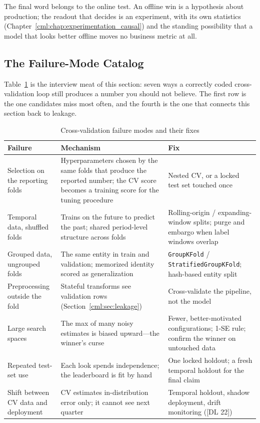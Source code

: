 The final word belongs to the online test. An offline win is a hypothesis about production; the readout that decides is an experiment, with its own statistics (Chapter~\ref{cml:chap:experimentation_causal}) and the standing possibility that a model that looks better offline moves no business metric at all.

\subsection{The Failure-Mode Catalog}

Table~\ref{cml:tab:cv_failures} is the interview meat of this section: seven ways a correctly coded cross-validation loop still produces a number you should not believe. The first row is the one candidates miss most often, and the fourth is the one that connects this section back to leakage.

\begin{table}[H]
\centering
\small
\caption{Cross-validation failure modes and their fixes}
\label{cml:tab:cv_failures}
\begin{tabularx}{\textwidth}{lXX}
\toprule
\textbf{Failure} & \textbf{Mechanism} & \textbf{Fix} \\
\midrule
Selection on the reporting folds & Hyperparameters chosen by the same folds that produce the reported number; the CV score becomes a training score for the tuning procedure & Nested CV, or a locked test set touched once \\
Temporal data, shuffled folds & Trains on the future to predict the past; shared period-level structure across folds & Rolling-origin / expanding-window splits; purge and embargo when label windows overlap \\
Grouped data, ungrouped folds & The same entity in train and validation; memorized identity scored as generalization & \texttt{GroupKFold} / \texttt{StratifiedGroupKFold}; hash-based entity split \\
Preprocessing outside the fold & Stateful transforms see validation rows (Section~\ref{cml:sec:leakage}) & Cross-validate the pipeline, not the model \\
Large search spaces & The max of many noisy estimates is biased upward---the winner's curse & Fewer, better-motivated configurations; 1-SE rule; confirm the winner on untouched data \\
Repeated test-set use & Each look spends independence; the leaderboard is fit by hand & One locked holdout; a fresh temporal holdout for the final claim \\
Shift between CV data and deployment & CV estimates in-distribution error only; it cannot see next quarter & Temporal holdout, shadow deployment, drift monitoring ([DL 22]) \\
\bottomrule
\end{tabularx}
\end{table}

